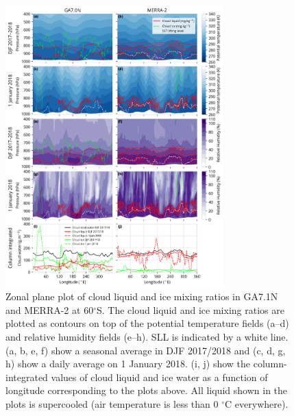\clearpage
\begin{figure}[t]
\centering
\includegraphics[width=0.75\textwidth]{chapter2/fig/zone_panel_rev2.png}
\caption[Zonal plane plot of cloud liquid and ice mixing ratios in GA7.1N and MERRA-2 at
60$^\circ$S]{
Zonal plane plot of cloud liquid and ice mixing ratios in GA7.1N and MERRA-2 at
60$^\circ$S. The cloud liquid and ice mixing ratios are plotted as contours on
top of the potential temperature fields (a--d) and relative humidity
fields (e--h). SLL is indicated by a white line. (a, b, e, f)
show a seasonal average in DJF 2017/2018 and (c, d, g, h)
show a daily average on 1 January 2018. (i, j) show the
column-integrated values of cloud liquid and ice water as a function of
longitude corresponding to the plots above. All liquid shown in the plots
is supercooled (air temperature is less than 0 $^\circ$C everywhere).
}
\label{fig:zone-panel}
\end{figure}

